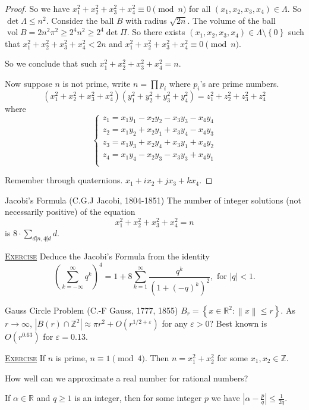 \documentclass{report}
\newcommand{\R}{\mathbb{R}}
\newcommand{\Z}{\mathbb{Z}}
\newcommand{\vol}{\operatorname{vol}}
\newcommand{\norm}[1]{\left\| #1 \right\|}
\newcommand{\set}[1]{\left\{ #1 \right\}}
\newcommand{\fancyem}[1]{\underline{\textsc{#1}}}
\theoremstyle{definition}
\theoremstyle{remark}
\numberwithin{equation}{section}
\begin{document}
\begin{proof}
    So we have $x_1^2 + x_2^2 + x_3^2 + x_4^2 \equiv 0 \pmod{n}$ for all $(x_1, x_2, x_3, x_4) \in \Lambda$. So $\det \Lambda \leq n^2$. Consider the ball $B$ with radius $\sqrt{2n}$. The volume of the ball $\vol B = 2n^2\pi^2 \geq 2^4 n^2 \geq 2^4 \det \Pi$. So there exists $(x_1, x_2, x_3, x_4) \in \Lambda \setminus \set{0}$ such that $x_1^2 + x_2^2 + x_3^2 + x_4^2 < 2n$ and $x_1^2 + x_2^2 + x_3^2 + x_4^2 \equiv 0 \pmod{n}$.

    So we conclude that such $x_1^2 + x_2^2 + x_3^2 + x_4^2 = n$.

    Now suppose $n$ is not prime, write $n = \prod p_i$ where $p_i$'s are prime numbers. \[(x_1^2 + x_2^2 + x_3^2 + x_4^2)(y_1^2 + y_2^2 + y_3^2 + y_4^2) = z_1^2 + z_2^2 + z_3^2 + z_4^2\] where \[\begin{cases}
        z_1 = x_1y_1 - x_2y_2 - x_3y_3 - x_4y_4 \\
        z_2 = x_1y_2 + x_2y_1 + x_3y_4 - x_4y_3 \\
        z_3 = x_1y_3 + x_2y_4 + x_3y_1 + x_4y_2 \\
        z_4 = x_1y_4 - x_2y_3 - x_3y_3 + x_4y_1 \\
    \end{cases}\]

    Remember through quaternions. $x_1 + ix_2 + jx_3 + kx_4$.
\end{proof}

Jacobi's Formula (C.G.J Jacobi, 1804-1851)
The number of integer solutions (not necessarily positive) of the equation \[x_1^2 + x_2^2 + x_3^2 + x_4^2 = n\] is $8 \cdot \sum_{d | n, 4 \not| d} d$.

\fancyem{Exercise} Deduce the Jacobi's Formula from the identity \[
  \left(\sum_{k=-\infty}^\infty q^k\right)^4 = 1 + 8\sum_{k=1}^\infty \frac{q^k}{\left(1 + (-q)^k\right)^2}, \text{ for } |q| < 1.
\]

Gauss Circle Problem (C.-F Gauss, 1777, 1855)
$B_r = \set{x \in \R^2: \norm{x} \leq r}$. As $r \to \infty$, $|B(r) \cap \Z^2| \approx \pi r^2 + O(r^{1/2 + \varepsilon})$ for any $\varepsilon > 0$? Best known is $O(r^{0.63})$ for $\varepsilon = 0.13$.

\fancyem{Exercise} If $n$ is prime, $n \equiv 1 \pmod{4}$. Then $n = x_1^2 + x_2^2$ for some $x_1, x_2 \in \Z$.

How well can we approximate a real number for rational numbers?

If $\alpha \in \R$ and $q \geq 1$ is an integer, then for some integer $p$ we have $\left|\alpha - \frac{p}{q}\right| \leq \frac{1}{2q}$.
\end{document}
